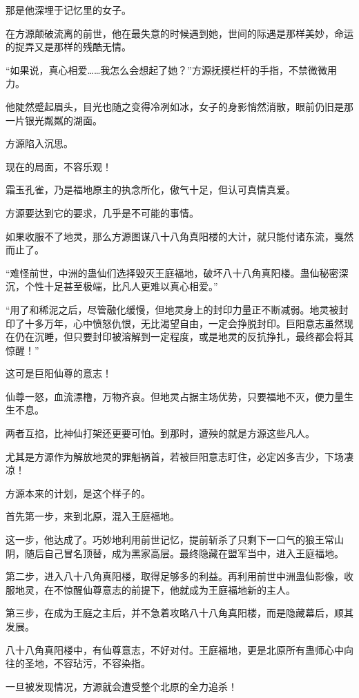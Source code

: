 \begin{this_body}
那是他深埋于记忆里的女子。

在方源颠破流离的前世，他在最失意的时候遇到她，世间的际遇是那样美妙，命运的捉弄又是那样的残酷无情。

“如果说，真心相爱……我怎么会想起了她？”方源抚摸栏杆的手指，不禁微微用力。

他陡然蹙起眉头，目光也随之变得冷冽如冰，女子的身影悄然消散，眼前仍旧是那一片银光粼粼的湖面。

方源陷入沉思。

现在的局面，不容乐观！

霜玉孔雀，乃是福地原主的执念所化，傲气十足，但认可真情真爱。

方源要达到它的要求，几乎是不可能的事情。

如果收服不了地灵，那么方源图谋八十八角真阳楼的大计，就只能付诸东流，戛然而止了。

“难怪前世，中洲的蛊仙们选择毁灭王庭福地，破坏八十八角真阳楼。蛊仙秘密深沉，个性十足甚至极端，比凡人更难以真心相爱。”

“用了和稀泥之后，尽管融化缓慢，但地灵身上的封印力量正不断减弱。地灵被封印了十多万年，心中愤怒仇恨，无比渴望自由，一定会挣脱封印。巨阳意志虽然现在仍在沉睡，但只要封印被溶解到一定程度，或是地灵的反抗挣扎，最终都会将其惊醒！”

这可是巨阳仙尊的意志！

仙尊一怒，血流漂橹，万物齐哀。但地灵占据主场优势，只要福地不灭，便力量生生不息。

两者互掐，比神仙打架还更要可怕。到那时，遭殃的就是方源这些凡人。

尤其是方源作为解放地灵的罪魁祸首，若被巨阳意志盯住，必定凶多吉少，下场凄凉！

方源本来的计划，是这个样子的。

首先第一步，来到北原，混入王庭福地。

这一步，他达成了。巧妙地利用前世记忆，提前斩杀了只剩下一口气的狼王常山阴，随后自己冒名顶替，成为黑家高层。最终隐藏在盟军当中，进入王庭福地。

第二步，进入八十八角真阳楼，取得足够多的利益。再利用前世中洲蛊仙影像，收服地灵，在不惊醒仙尊意志的前提下，他就成为王庭福地新的主人。

第三步，在成为王庭之主后，并不急着攻略八十八角真阳楼，而是隐藏幕后，顺其发展。

八十八角真阳楼中，有仙尊意志，不好对付。王庭福地，更是北原所有蛊师心中向往的圣地，不容玷污，不容染指。

一旦被发现情况，方源就会遭受整个北原的全力追杀！


\end{this_body}
